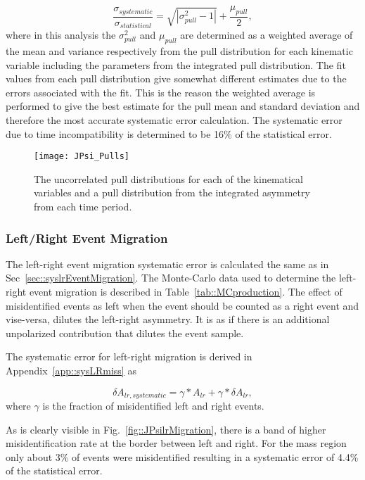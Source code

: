 \begin{equation}
  \label{equ::sysErrorPullJPsi}
  \frac{\sigma_{systematic}}{\sigma_{statistical}} =
  \sqrt{|\sigma^2_{pull} - 1|} + \frac{\mu_{pull}}{2},
\end{equation}
\noindent
where in this analysis the $\sigma_{pull}^2$ and $\mu_{pull}$ are determined as
a weighted average of the mean and variance respectively from the pull
distribution for each kinematic variable including the parameters from the
integrated pull distribution.  The fit values from each pull distribution give
somewhat different estimates due to the errors associated with the fit.  This is
the reason the weighted average is performed to give the best estimate for the
pull mean and standard deviation and therefore the most accurate systematic
error calculation.  The systematic error due to time incompatibility is
determined to be 16\% of the statistical error.

\begin{figure}[h!t]
  \centering \texttt{[image: JPsi\_Pulls]}
  \caption{The uncorrelated pull distributions for each of the kinematical
    variables and a pull distribution from the integrated asymmetry from each
    time period.}
  \label{fig::JPsi_Pulls}
\end{figure}


\subsubsection{Left/Right Event Migration}
The left-right event migration systematic error is calculated the same as in
Sec~\ref{sec::syslrEventMigration}.  The Monte-Carlo data used to determine the
left-right event migration is described in Table~\ref{tab::MCproduction}.  The
effect of misidentified events as left when the event should be counted as a
right event and vise-versa, dilutes the left-right asymmetry.  It is as if
there is an additional unpolarized contribution that dilutes the event sample.

The systematic error for left-right migration is derived in
Appendix~\ref{app::sysLRmiss} as

\begin{equation}
  \delta A_{lr,systematic} = \gamma *A_{lr} + \gamma *\delta A_{lr},
\end{equation}
\noindent
where $\gamma$ is the fraction of misidentified left and right events.  

As is clearly visible in Fig.~\ref{fig::JPsilrMigration}, there is a band of
higher misidentification rate at the border between left and right.  For the
{\jp} mass region only about 3\% of events were misidentified resulting in a
systematic error of 4.4\% of the statistical error.

